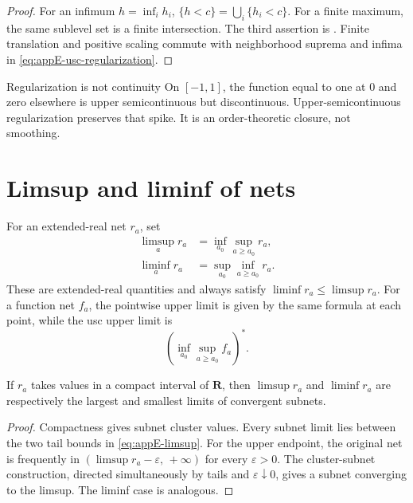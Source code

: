 \begin{proof}
For an infimum \(h=\inf_i h_i\),
\(\{h<c\}=\bigcup_i\{h_i<c\}\).
For a finite maximum, the same sublevel set is a finite intersection.
The third assertion is
.
Finite translation and positive scaling commute with neighborhood suprema
and infima in \eqref{eq:appE-usc-regularization}.
\end{proof}

\begin{warning}{Regularization is not continuity}
\label{warn:appE-regularization-not-continuity}
On \([-1,1]\), the function equal to one at \(0\) and zero elsewhere is
upper semicontinuous but discontinuous.
Upper-semicontinuous regularization preserves that spike.
It is an order-theoretic closure, not smoothing.
\end{warning}

\section{Limsup and liminf of nets}
\label{sec:appE-limsup}

For an extended-real net \(r_a\), set
\[
\begin{aligned}
 \limsup_a r_a&=\inf_{a_0}\sup_{a\geq a_0}r_a,\\
 \liminf_a r_a&=\sup_{a_0}\inf_{a\geq a_0}r_a.
\end{aligned}
\tag{E.6}\label{eq:appE-limsup}
\]
These are extended-real quantities and always satisfy
\(\liminf r_a\leq\limsup r_a\).
For a function net \(f_a\), the pointwise upper limit is given by the same
formula at each point, while the usc upper limit is
\[
 \left(\inf_{a_0}\sup_{a\geq a_0}f_a\right)^*.
\tag{E.7}\label{eq:appE-usc-limsup}
\]

\begin{proposition}\label{prop:appE-real-cluster}
If \(r_a\) takes values in a compact interval of \(\mathbf R\), then
\(\limsup r_a\) and \(\liminf r_a\) are respectively the largest and
smallest limits of convergent subnets.
\end{proposition}

\begin{proof}
Compactness gives subnet cluster values.
Every subnet limit lies between the two tail bounds in
\eqref{eq:appE-limsup}.
For the upper endpoint, the original net is frequently in
\((\limsup r_a-\varepsilon,\,+\infty)\) for every \(\varepsilon>0\).
The cluster-subnet construction, directed simultaneously by tails and
\(\varepsilon\downarrow0\), gives a subnet converging to the limsup.
The liminf case is analogous.
\end{proof}

